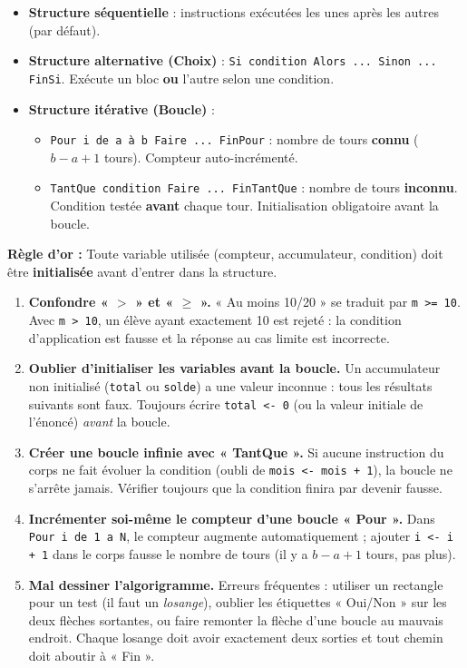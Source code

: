 \documentclass[11pt]{article}
\begin{document}
\begin{aretenir}
\begin{itemize}
\item \textbf{Structure séquentielle} : instructions exécutées les unes après les autres (par défaut).
\item \textbf{Structure alternative (Choix)} : \texttt{Si condition Alors ... Sinon ... FinSi}. Exécute un bloc \textbf{ou} l'autre selon une condition.
\item \textbf{Structure itérative (Boucle)} :
\begin{itemize}
\item \texttt{Pour i de a à b Faire ... FinPour} : nombre de tours \textbf{connu} ($b-a+1$ tours). Compteur auto-incrémenté.
\item \texttt{TantQue condition Faire ... FinTantQue} : nombre de tours \textbf{inconnu}. Condition testée \textbf{avant} chaque tour. Initialisation obligatoire avant la boucle.
\end{itemize}
\end{itemize}
\textbf{Règle d'or :} Toute variable utilisée (compteur, accumulateur, condition) doit être \textbf{initialisée} avant d'entrer dans la structure.
\end{aretenir}

\begin{attention}
\begin{enumerate}
\item \textbf{Confondre « $>$ » et « $\geq$ ».} « Au moins 10/20 » se traduit par \texttt{m >= 10}. Avec \texttt{m > 10}, un élève ayant exactement 10 est rejeté : la condition d'application est fausse et la réponse au cas limite est incorrecte.
\item \textbf{Oublier d'initialiser les variables avant la boucle.} Un accumulateur non initialisé (\texttt{total} ou \texttt{solde}) a une valeur inconnue : tous les résultats suivants sont faux. Toujours écrire \texttt{total <- 0} (ou la valeur initiale de l'énoncé) \emph{avant} la boucle.
\item \textbf{Créer une boucle infinie avec « TantQue ».} Si aucune instruction du corps ne fait évoluer la condition (oubli de \texttt{mois <- mois + 1}), la boucle ne s'arrête jamais. Vérifier toujours que la condition finira par devenir fausse.
\item \textbf{Incrémenter soi-même le compteur d'une boucle « Pour ».} Dans \texttt{Pour i de 1 a N}, le compteur augmente automatiquement ; ajouter \texttt{i <- i + 1} dans le corps fausse le nombre de tours (il y a $b - a + 1$ tours, pas plus).
\item \textbf{Mal dessiner l'algorigramme.} Erreurs fréquentes : utiliser un rectangle pour un test (il faut un \emph{losange}), oublier les étiquettes « Oui/Non » sur les deux flèches sortantes, ou faire remonter la flèche d'une boucle au mauvais endroit. Chaque losange doit avoir exactement deux sorties et tout chemin doit aboutir à « Fin ».
\end{enumerate}
\end{attention}
\end{document}
